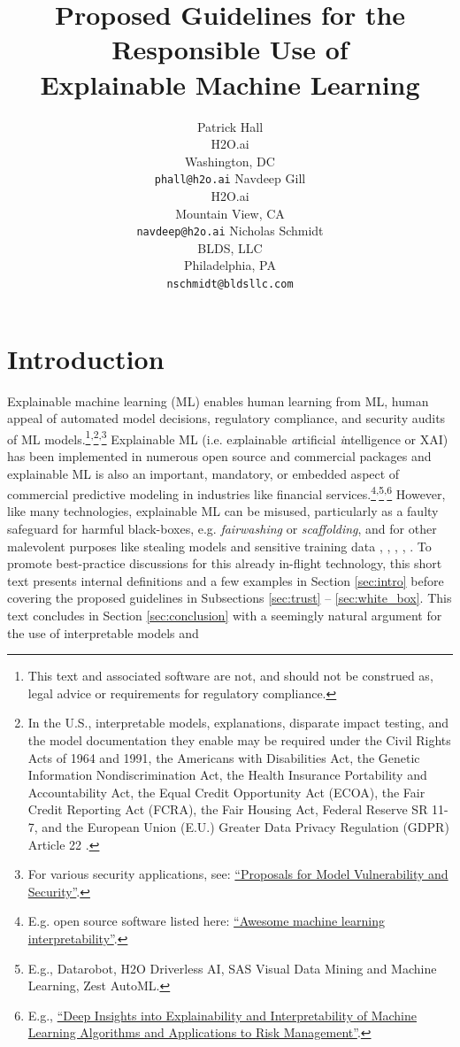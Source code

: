 \documentclass{article}
\title{Proposed Guidelines for the Responsible Use of\\ Explainable Machine Learning}
\author{Patrick Hall\\
H2O.ai\\
Washington, DC\\
\texttt{phall@h2o.ai} \And
Navdeep Gill\\
H2O.ai\\
Mountain View, CA\\
\texttt{navdeep@h2o.ai} \And
Nicholas Schmidt\\
BLDS, LLC\\
Philadelphia, PA\\
\texttt{nschmidt@bldsllc.com}
}
\begin{document}
\maketitle

\section{Introduction}

Explainable machine learning (ML) enables human learning from ML, human appeal of automated model decisions, regulatory compliance, and security audits of ML models.\footnote{\scriptsize{This text and associated software are not, and should not be construed as, legal advice or requirements for regulatory compliance.}}\textsuperscript{,}\footnote{\scriptsize{In the U.S., interpretable models, explanations, disparate impact testing, and the model documentation they enable may be required under the Civil Rights Acts of 1964 and 1991, the Americans with Disabilities Act, the Genetic Information Nondiscrimination Act, the Health Insurance Portability and Accountability Act, the Equal Credit Opportunity Act (ECOA), the Fair Credit Reporting Act (FCRA), the Fair Housing Act, Federal Reserve SR 11-7, and the European Union (E.U.) Greater Data Privacy Regulation (GDPR) Article 22 \cite{ff_interpretability}}.\label{fn:regs}}\textsuperscript{,}\footnote{\scriptsize{For various security applications, see: \href{https://www.oreilly.com/ideas/proposals-for-model-vulnerability-and-security}{``Proposals for Model Vulnerability and Security''}.}} Explainable ML (i.e. e\textit{x}plainable \textit{a}rtificial \textit{i}ntelligence or XAI) has been implemented in numerous open source and commercial packages and explainable ML is also an important, mandatory, or embedded aspect of commercial predictive modeling in industries like financial services.\footnote{\scriptsize{E.g. open source software listed here: \href{https://github.com/jphall663/awesome-machine-learning-interpretability}{``Awesome machine learning interpretability''}.}}\textsuperscript{,}\footnote{\scriptsize{E.g.,  Datarobot, H2O Driverless AI, SAS Visual Data Mining and Machine Learning, Zest AutoML.}}\textsuperscript{,}\footnote{\scriptsize{E.g., \href{https://ww2.amstat.org/meetings/jsm/2019/onlineprogram/AbstractDetails.cfm?abstractid=303053}{``Deep Insights into Explainability and Interpretability of Machine Learning Algorithms and Applications to Risk Management''}.}\label{fn:chen}} However, like many technologies, explainable ML can be misused, particularly as a faulty safeguard for harmful black-boxes, e.g. \textit{fairwashing} or \textit{scaffolding}, and for other malevolent purposes like stealing models and sensitive training data \cite{fair_washing}, \cite{please_stop}, \cite{membership_inference}, \cite{scaffolding}, \cite{model_stealing}. To promote best-practice discussions for this already in-flight technology, this short text presents internal definitions and a few examples in Section \ref{sec:intro} before covering the proposed guidelines in Subsections \ref{sec:trust} -- \ref{sec:white_box}. This text concludes in Section \ref{sec:conclusion} with a seemingly natural argument for the use of interpretable models and 
\end{document}
